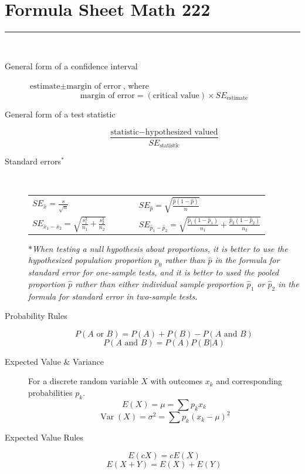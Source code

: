 \documentclass[11pt]{article}
\newcommand{\Var}{\operatorname{Var}}
\newcommand{\ds}{\displaystyle}
\begin{document}
\section*{Formula Sheet \hfill Math 222}
\hrule 
~\\

\begin{description}

\item[General form of a confidence interval] $\text{estimate} \pm \text{margin of error}$, where
$$\text{margin of error} = (\text{critical value}) \times SE_{\text{estimate}}$$
\vfill

\item[General form of a test statistic]
$$ \frac{\text{statistic} - \text{hypothesized valued}}{SE_{\text{statistic}}}$$
\vfill

\item[Standard errors$^*$] ~
\begin{center}
\begin{tabular}{lcl} 
$\ds SE_{\bar{x}} = \frac{s}{\sqrt{n}}$ & ~~~~ & $\ds SE_{\hat{p}} = \sqrt{\frac{\hat{p}(1-\hat{p})}{n}}$ \\
$\ds SE_{\bar{x}_1 - \bar{x}_2} = \sqrt{\frac{s_1^2}{n_1}+\frac{s_2^2}{n_2}}$ &  & $\ds SE_{\hat{p}_1-\hat{p}_2} = \sqrt{\frac{\hat{p}_1(1-\hat{p}_1)}{n_1}+\frac{\hat{p}_2(1-\hat{p}_2)}{n_2}}$ \\
\end{tabular}
\end{center}
$*$\textit{When testing a null hypothesis about proportions, it is better to use the hypothesized population proportion $p_0$ rather than $\hat{p}$ in the formula for standard error for one-sample tests, and it is better to used the pooled proportion $\hat{p}$ rather than either individual sample proportion $\hat{p}_1$ or $\hat{p}_2$ in the formula for standard error in two-sample tests. }
\vfill


\item[Probability Rules]
$$P(A \text{ or } B) = P(A) + P(B) - P(A \text{ and } B)$$
$$P(A \text{ and } B) = P(A) P(B|A)$$
\vfill



\item[Expected Value \& Variance] For a discrete random variable $X$ with outcomes $x_k$ and corresponding probabilities $p_k$.  
$$E(X) = \mu = \sum p_k x_k$$
$$\Var(X) = \sigma^2 = \sum p_k (x_k - \mu)^2$$
\vfill

\item[Expected Value Rules]
$$E(cX) = cE(X)$$
$$E(X+Y) = E(X)+E(Y)$$
\vfill


\end{description}
\end{document}

